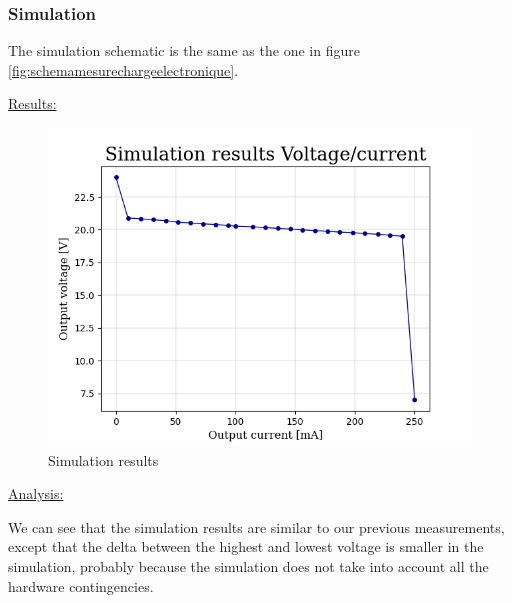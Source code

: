 {\subsubsection{Simulation}

The simulation schematic is the same as the one in figure \ref{fig:schemamesurechargeelectronique}.

\underline{Results:}
\begin{figure}[h]
	\centering
	\includegraphics[width=0.7\linewidth]{../../Simu-pointG}
	\caption{Simulation results}
	\label{fig:simu-pointg}
\end{figure}

\underline{Analysis:}\vspace{+6pt}

We can see that the simulation results are similar to our previous measurements, except that the delta between the highest and lowest voltage is smaller in the simulation, probably because the simulation does not take into account all the hardware contingencies.

}

\newpage
